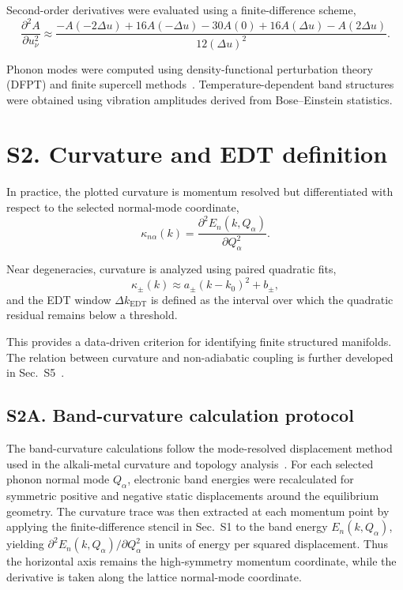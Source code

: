 \documentclass[12pt]{article}
\begin{document}
Second-order derivatives were evaluated using a finite-difference scheme,
\begin{equation}
\frac{\partial^2 A}{\partial u_\nu^2}
\approx
\frac{-A(-2\Delta u) + 16A(-\Delta u) - 30A(0) + 16A(\Delta u) - A(2\Delta u)}{12(\Delta u)^2}.
\end{equation}

Phonon modes were computed using density-functional perturbation theory (DFPT) and finite supercell methods~\cite{Baroni2001}. Temperature-dependent band structures were obtained using vibration amplitudes derived from Bose--Einstein statistics.

\section*{S2. Curvature and EDT definition}

In practice, the plotted curvature is momentum resolved but differentiated with respect to the selected normal-mode coordinate,
\begin{equation}
\kappa_{n\alpha}(k) =
\frac{\partial^2 E_n(k,Q_\alpha)}{\partial Q_\alpha^2}.
\end{equation}

Near degeneracies, curvature is analyzed using paired quadratic fits,
\begin{equation}
\kappa_\pm(k) \approx a_\pm (k-k_0)^2 + b_\pm,
\end{equation}
and the EDT window $\Delta k_{\mathrm{EDT}}$ is defined as the interval over which the quadratic residual remains below a threshold.

This provides a data-driven criterion for identifying finite structured manifolds. The relation between curvature and non-adiabatic coupling is further developed in Sec.~S5~\cite{Mead1979,Yarkony1996}.

\subsection*{S2A. Band-curvature calculation protocol}

The band-curvature calculations follow the mode-resolved displacement method used in the alkali-metal curvature and topology analysis~\cite{Hu2026_JPCM}. For each selected phonon normal mode $Q_\alpha$, electronic band energies were recalculated for symmetric positive and negative static displacements around the equilibrium geometry. The curvature trace was then extracted at each momentum point by applying the finite-difference stencil in Sec.~S1 to the band energy $E_n(k,Q_\alpha)$, yielding $\partial^2 E_n(k,Q_\alpha)/\partial Q_\alpha^2$ in units of energy per squared displacement. Thus the horizontal axis remains the high-symmetry momentum coordinate, while the derivative is taken along the lattice normal-mode coordinate.
\end{document}
